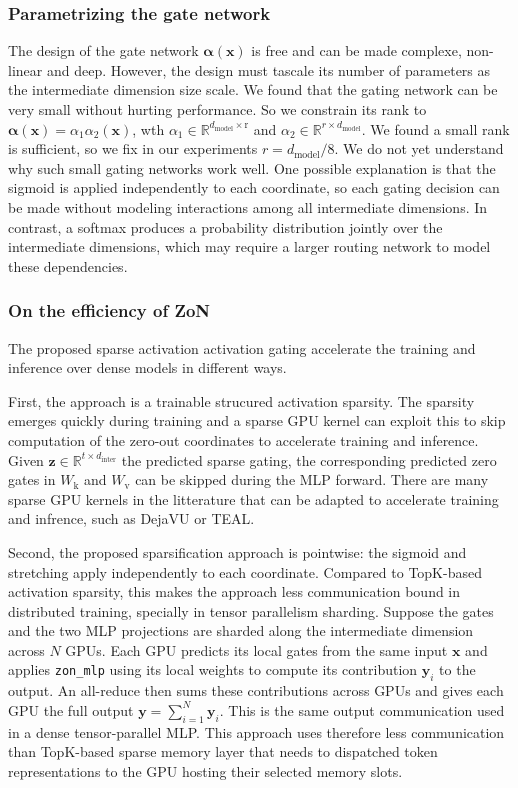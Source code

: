 \documentclass{article} %
\begin{document}
\subsubsection{Parametrizing the gate network}
The design of the gate network $\boldsymbol{\alpha}(\mathbf{x})$
is free and can be made complexe, non-linear and deep. However,
the design must tascale its number of parameters 
as the intermediate dimension size scale.
We found that the gating network can be very small without hurting performance. 
So we constrain its rank to
$\boldsymbol{\alpha}(\mathbf{x}) = \alpha_1\alpha_2(\mathbf{x})$,
wth $\alpha_1 \in \mathbb{R}^{d_\text{model} \times \text{r}}$ and
$\alpha_2 \in \mathbb{R}^{r \times d_\text{model}}$.
We found a small rank is sufficient, so we fix in our experiments $r = d_{\text{model}} / 8$.
We do not yet understand why such small gating networks work well. One possible
explanation is that the sigmoid is applied independently to each coordinate, so
each gating decision can be made without modeling interactions among all
intermediate dimensions. In contrast, a softmax produces a probability
distribution jointly over the intermediate dimensions, which may require a
larger routing network to model these dependencies.

\subsubsection{On the efficiency of ZoN}
The proposed sparse activation activation gating accelerate the training and
inference over dense models in different ways.

First, the approach is a trainable strucured activation sparsity. The sparsity
emerges quickly during training and a sparse GPU kernel can exploit this to skip
computation of the zero-out coordinates to accelerate training and inference.
Given $\textbf{z} \in \mathbb{R}^{t \times d_{\text{inter}}}$ the predicted sparse gating,
the corresponding predicted zero gates in $W_\text{k}$ and $W_\text{v}$ can be skipped
during the MLP forward. There are many sparse GPU kernels in the litterature
that can be adapted to accelerate training and infrence, such as DejaVU or TEAL.

Second, the proposed sparsification approach is pointwise: 
the sigmoid and stretching apply independently
to each coordinate. Compared to TopK-based activation sparsity,
this makes the approach less communication bound in
distributed training, specially in tensor parallelism sharding. 
Suppose the gates and the two MLP projections are sharded
along the intermediate dimension across $N$ GPUs. 
Each GPU predicts its local gates from the same input $\mathbf{x}$ and applies
\texttt{zon\_mlp} using its local weights to compute its contribution
$\mathbf{y}_i$ to the output. An all-reduce then sums these contributions across
GPUs and gives each GPU the full output $\mathbf{y}=\sum_{i=1}^{N}\mathbf{y}_i$.
This is the same output communication used in a dense tensor-parallel MLP.
This approach uses therefore less communication than TopK-based
sparse memory layer that needs to dispatched token representations to the
GPU hosting their selected memory slots.
\end{document}
